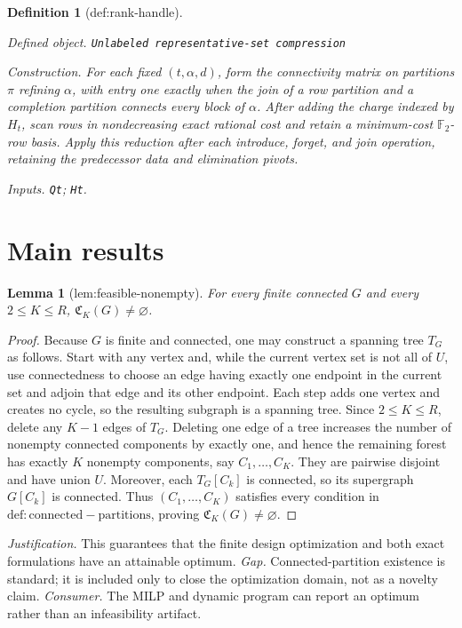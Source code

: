 \documentclass{article}
\newtheorem{definition}{Definition}
\newtheorem{lemma}{Lemma}
\begin{document}
\begin{definition}[def:rank-handle]\label{def:rank-handle}
\par\smallskip\noindent\emph{Defined object.} \texttt{Unlabeled representative-\allowbreak{}set compression}
\par\smallskip\noindent\emph{Construction.} For each fixed \((t,\alpha,d)\), form the connectivity matrix on partitions \(\pi\) refining \(\alpha\), with entry one exactly when the join of a row partition and a completion partition connects every block of \(\alpha\).  After adding the charge indexed by \(H_t\), scan rows in nondecreasing exact rational cost and retain a minimum-cost \(\mathbb F_2\)-row basis.  Apply this reduction after each introduce, forget, and join operation, retaining the predecessor data and elimination pivots.
\par\smallskip\noindent\emph{Inputs.} \texttt{Qt}; \texttt{Ht}.
\end{definition}

\section{Main results}

\begin{lemma}[lem:feasible-nonempty]\label{lem:feasible-nonempty}
For every finite connected \(G\) and every \(2\le K\le R\), \(\mathfrak C_K(G)\ne\varnothing\).
\end{lemma}
\begin{proof}
Because \(G\) is finite and connected, one may construct a spanning tree \(T_G\) as follows.  Start with any vertex and, while the current vertex set is not all of \(U\), use connectedness to choose an edge having exactly one endpoint in the current set and adjoin that edge and its other endpoint.  Each step adds one vertex and creates no cycle, so the resulting subgraph is a spanning tree.  Since \(2\le K\le R\), delete any \(K-1\) edges of \(T_G\).  Deleting one edge of a tree increases the number of nonempty connected components by exactly one, and hence the remaining forest has exactly \(K\) nonempty components, say \(C_1,\ldots,C_K\).  They are pairwise disjoint and have union \(U\).  Moreover, each \(T_G[C_k]\) is connected, so its supergraph \(G[C_k]\) is connected.  Thus \((C_1,\ldots,C_K)\) satisfies every condition in \(\mathrm{def:connected-partitions}\), proving \(\mathfrak C_K(G)\ne\varnothing\).
\end{proof}
\par\smallskip\noindent \textit{Justification.} This guarantees that the finite design optimization and both exact formulations have an attainable optimum. \textit{Gap.} Connected-partition existence is standard; it is included only to close the optimization domain, not as a novelty claim. \textit{Consumer.} The MILP and dynamic program can report an optimum rather than an infeasibility artifact.
\end{document}
